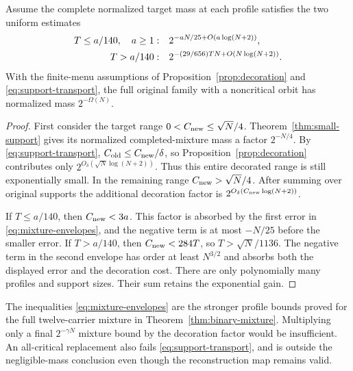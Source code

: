 \begin{proposition}\label{prop:absorb-decorations}
Assume the complete normalized target mass at each profile satisfies
the two uniform estimates
\begin{align}\label{eq:mixture-envelopes}
 T\leq a/140,\quad a\geq1:\quad&
 2^{-aN/25+O(a\log(N+2))},\notag\\
 T>a/140:\quad&
 2^{-(29/656)TN+O(N\log(N+2))}.
\end{align}
With the finite-menu assumptions of Proposition~\ref{prop:decoration}
and \eqref{eq:support-transport}, the full original family with a
noncritical orbit has normalized mass $2^{-\Omega(N)}$.
\end{proposition}
\begin{proof}
First consider the target range
$0<C_{\rm new}\leq\sqrt N/4$.  Theorem~\ref{thm:small-support}
gives its normalized completed-mixture mass a factor $2^{-N/4}$.
By \eqref{eq:support-transport},
$C_{\rm old}\leq C_{\rm new}/\delta$, so
Proposition~\ref{prop:decoration} contributes only
$2^{O_\delta(\sqrt N\log(N+2))}$.  Thus this entire decorated range is
still exponentially small.  In the remaining range
$C_{\rm new}>\sqrt N/4$.  After summing over original supports the
additional decoration factor is
$2^{O_\delta(C_{\rm new}\log(N+2))}$.

If $T\leq a/140$, then $C_{\rm new}<3a$. This factor is absorbed by
the first error in \eqref{eq:mixture-envelopes}, and the negative term
is at most $-N/25$ before the smaller error. If $T>a/140$, then
$C_{\rm new}<284T$, so $T>\sqrt N/1136$. The negative term
in the second envelope has order at least $N^{3/2}$ and absorbs both
the displayed error and the decoration cost. There are only polynomially
many profiles and support sizes. Their sum retains the exponential gain.
\end{proof}

The inequalities \eqref{eq:mixture-envelopes} are the stronger profile
bounds proved for the full twelve-carrier mixture in
Theorem~\ref{thm:binary-mixture}.
Multiplying only a final $2^{-\gamma N}$ mixture bound by the decoration
factor would be insufficient. An all-critical replacement also fails
\eqref{eq:support-transport}, and is outside the negligible-mass
conclusion even though the reconstruction map remains valid.
